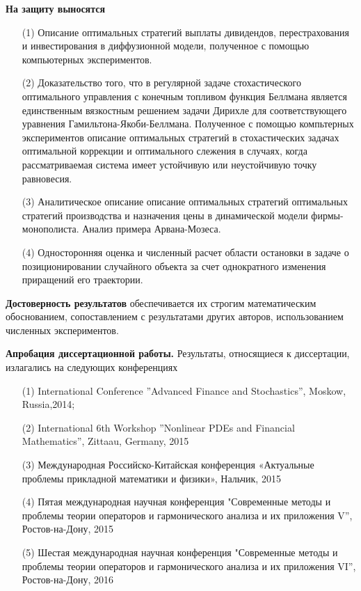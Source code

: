 \documentclass[twoside,12pt]{article}
\begin{document}
\textbf{На защиту выносятся}
\begin{itemize}
\item[(1)] Описание оптимальных стратегий выплаты дивидендов, перестрахования и инвестирования в диффузионной модели, полученное с помощью компьютерных экспериментов.
\item[(2)] Доказательство того, что в регулярной задаче стохастического оптимального управления с конечным топливом функция Беллмана является единственным вязкостным решением задачи Дирихле для соответствующего уравнения Гамильтона-Якоби-Беллмана.
Полученное с помощью компьтерных экспериментов описание оптимальных стратегий в стохастических задачах оптимальной коррекции и оптимального слежения в случаях, когда рассматриваемая система имеет устойчивую или неустойчивую точку равновесия.
\item[(3)] Аналитическое описание описание оптимальных стратегий оптимальных стратегий производства и назначения цены в динамической модели фирмы-монополиста. Анализ примера Арвана-Мозеса.
\item[(4)] Односторонняя оценка и численный расчет области остановки в задаче о позиционировании случайного объекта за счет однократного изменения приращений его траектории.
\end{itemize}

\textbf{Достоверность результатов} обеспечивается их строгим математическим обоснованием, сопоставлением с результатами других авторов, использованием численных экспериментов.

\textbf{Апробация диссертационной работы.} Результаты, относящиеся к диссертации, излагались на следующих конференциях
\begin{itemize}
\item[(1)] International Conference  ''Advanced Finance and Stochastics'', Moskow, Russia,2014;
\item[(2)] International 6th Workshop ''Nonlinear PDEs and Financial Mathematics'', Zittaau, Germany, 2015
\item[(3)] Международная Российско-Китайская конференция «Актуальные проблемы прикладной математики и физики», Нальчик, 2015
\item[(4)] Пятая международная научная конференция "Современные методы и проблемы теории операторов и гармонического анализа и их приложения V'', Ростов-на-Дону, 2015
\item[(5)] Шестая международная научная конференция "Современные методы и проблемы теории операторов и гармонического анализа и их приложения VI'', Ростов-на-Дону, 2016
\end{itemize}
\end{document}
